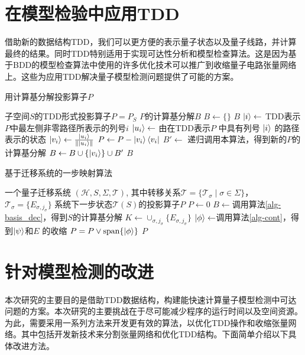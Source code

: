 \section{在模型检验中应用TDD}
借助新的数据结构TDD，我们可以更方便的表示量子状态以及量子线路，并计算最终的结果。同时TDD特别适用于实现可达性分析和模型检查算法。这是因为基于BDD的模型检查算法中使用的许多优化技术可以推广到收缩量子电路张量网络上\citep{Chaki_2018}。这些为应用TDD解决量子模型检测问题提供了可能的方案。
\begin{algorithm} 
\caption{用计算基分解投影算子$P$}
\label{alg-basis_dec} 
\begin{algorithmic}[1]
    \Require 子空间$S$的TDD形式投影算子$P=P_S$ 
    \Ensure $P$的计算基分解$B$
    \State $B\gets \{\}$
        \Return \(B\)
    \Else
        \State \(\ket{i} \gets\) TDD表示\(P\)中最左侧非零路径所表示的列号\(i\)
        \State \(\ket{u_i}\gets\) 由在TDD表示\(P\) 中具有列号 \(\ket{i}\) 的路径表示的状态
        \State \(\ket{v_i} \gets \frac{\ket{u_i}}{\|\ket{u_i}\|}\)
        \State \(P \gets P - \ket{v_i}\bra{v_i}\)
        \State \(B' \gets \) 递归调用本算法，得到新的$P$的计算基分解
        \State \(B \gets B \cup \{\ket{v_i}\} \cup B'\)
    \EndIf
    \State \Return \(B\)
\end{algorithmic}
\end{algorithm}
\begin{algorithm}
\caption{基于迁移系统的一步映射算法}
\label{alg-image}
\begin{algorithmic}[1] %
\Require 一个量子迁移系统 $(\mathcal{H},S,\Sigma,\mathcal{T})$, 其中转移关系$\mathcal{T}=\{\mathcal{T}_\sigma\mid \sigma\in \Sigma\}$，  $\mathcal{T}_\sigma=\{E_{\sigma,j_\sigma}\}$
\Ensure 系统下一步状态$\mathcal{T}(S)$的投影算子$P$
\State $P \gets 0$ 
\State $B \gets $调用算法\ref{alg-basis_dec}，得到$S$的计算基分解
\State $K \gets \cup_{\sigma,j_\sigma}\{E_{\sigma,j_\sigma}\}$
    \State $\ket{\phi} \gets $调用算法\ref{alg-cont}，得到\(\ket{\psi}\)和\(E\) 的收缩
    \State $P=P \vee \text{span}\{\ket{\phi}\}$
\EndFor
\State \Return $P$ 
\end{algorithmic}
\end{algorithm}

\section{针对模型检测的改进}
本次研究的主要目的是借助TDD数据结构，构建能快速计算量子模型检测中可达问题的方案。本次研究的主要挑战在于尽可能减少程序的运行时间以及空间资源。为此，需要采用一系列方法来开发更有效的算法，以优化TDD操作和收缩张量网络。其中包括开发新技术来分割张量网络和优化TDD结构。下面简单介绍以下具体改进方法。

